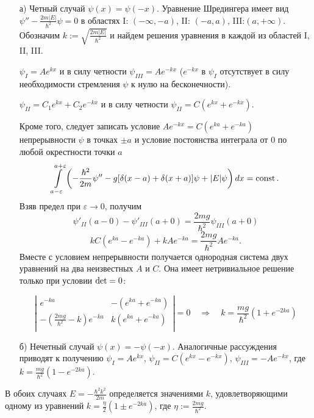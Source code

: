 \documentclass[a4paper,12pt]{article}
\begin{document}
\begin{itemize}

\item[а)] Четный случай $\psi(x)=\psi(-x)$. Уравнение Шредингера имеет вид
   $\psi''-\frac{2m|E|}{\hbar^2}\psi=0$ в областях I: $(-\infty,-a)$,
   II: $(-a,a)$, III:$(a,+\infty)$. Обозначим
   $k:=\sqrt{\frac{2m|E|}{\hbar^2}}$ и найдем решения уравнения в каждой из
   областей I, II, III.

   $\psi_I=Ae^{kx}$ и в силу четности $\psi_{III}=Ae^{-kx}$
   ($e^{-kx}$ в $\psi_I$ отсутствует в силу необходимости
   стремления $\psi$ к нулю на бесконечности).

   $\psi_{II}=C_1e^{kx}+C_2e^{-kx}$ и в силу четности
     $\psi_{II}=C(e^{kx}+e^{-kx})$.

   Кроме того, следует записать условие $Ae^{-kx}=C(e^{ka}+e^{-ka})$
   непрерывности $\psi$ в точках $\pm a$ и условие постоянства интеграла
   от 0 по любой окрестности точки $a$
   $$\int\limits_{a-\varepsilon}^{a+\varepsilon}
     \left(
       -\frac{\hbar^2}{2m}\psi''-g[\delta(x-a)+\delta(x+a)]\psi+|E|\psi
     \right)dx=\mathop{\rm const}.$$
   Взяв предел при $\varepsilon\to0$, получим
   $$\psi'_{II}(a-0)-\psi'_{III}(a+0)=\frac{2mg}{\hbar^2}\psi_{III}(a+0)$$
   $$kC(e^{ka}-e^{-ka})+kAe^{-ka}=\frac{2mg}{\hbar^2}Ae^{-ka}.$$
   Вместе с условием непрерывности получается однородная система двух
   уравнений на два неизвестных $A$ и $C$. Она имеет нетривиальное решение
   только при условии $\mathop{\rm det}=0$:

   $$\left|\begin{array}{cc}
     e^{-ka} & -(e^{ka}+e^{-ka})\\
     -\left(\frac{2mg}{\hbar^2}-k\right)e^{-ka} & k(e^{ka}+e^{-ka})\\
     \end{array}\right| = 0
   \quad \Rightarrow \quad
     k=\frac{mg}{\hbar^2}(1+e^{-2ka})$$

\item[б)] Нечетный случай $\psi(x)=-\psi(-x)$. Аналогичные рассуждения приводят
   к получению $\psi_I=Ae^{kx}$, $\psi_{II}=C(e^{kx}-e^{-kx})$,
   $\psi_{III}=-Ae^{-kx}$, где $k=\frac{mg}{\hbar^2}(1-e^{-2ka})$.

\end{itemize}

В обоих случаях $E=-\frac{\hbar^2k^2}{2m}$ определяется значениями $k$,
удовлетворяющими одному из уравнений $k=\frac\eta2(1\pm e^{-2ka})$,
где $\eta:=\frac{2mg}{\hbar^2}$.
\end{document}

